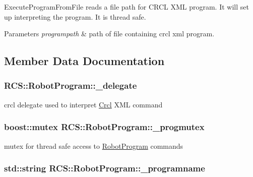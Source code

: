 Execute\-Program\-From\-File reads a file path for C\-R\-C\-L X\-M\-L program. It will set up interpreting the program. It is thread safe. 


\begin{DoxyParams}{Parameters}
{\em programpath} & path of file containing crcl xml program. \\
\hline
\end{DoxyParams}


\subsection{Member Data Documentation}
\hypertarget{classRCS_1_1RobotProgram_addf6e9d586d1fde1aa2b8105268d9e66}{
\subsubsection[{\-\_\-delegate}]{ R\-C\-S\-::\-Robot\-Program\-::\-\_\-delegate}}\label{classRCS_1_1RobotProgram_addf6e9d586d1fde1aa2b8105268d9e66}
crcl delegate used to interpret \hyperlink{namespaceCrcl}{Crcl} X\-M\-L command \hypertarget{classRCS_1_1RobotProgram_ad80469b94591e96c6a221e4769612668}{
\subsubsection[{\-\_\-progmutex}]{\setlength{\rightskip}{0pt plus 5cm}boost\-::mutex R\-C\-S\-::\-Robot\-Program\-::\-\_\-progmutex\hspace{0.3cm}{\ttfamily [static]}}}\label{classRCS_1_1RobotProgram_ad80469b94591e96c6a221e4769612668}
mutex for thread safe access to \hyperlink{classRCS_1_1RobotProgram}{Robot\-Program} commands \hypertarget{classRCS_1_1RobotProgram_aca7d780729e20c6d4e3988883b87527d}{
\subsubsection[{\-\_\-programname}]{\setlength{\rightskip}{0pt plus 5cm}std\-::string R\-C\-S\-::\-Robot\-Program\-::\-\_\-programname}}\label{classRCS_1_1RobotProgram_aca7d780729e20c6d4e3988883b87527d}
